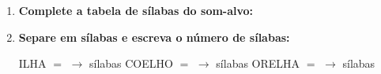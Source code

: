 \begin{exercicio}
\begin{enumerate}[resume]
  \item \textbf{Complete a tabela de sílabas do som-alvo:}

\begin{center}
\end{center}

  \item \textbf{Separe em sílabas e escreva o número de sílabas:}
  \begin{center}
  ILHA $=$ \underline{\hspace{1.2cm}} $\rightarrow$ \underline{\hspace{0.8cm}} sílabas \quad COELHO $=$ \underline{\hspace{1.2cm}} $\rightarrow$ \underline{\hspace{0.8cm}} sílabas \quad ORELHA $=$ \underline{\hspace{1.2cm}} $\rightarrow$ \underline{\hspace{0.8cm}} sílabas
  \end{center}

\end{enumerate}

\end{exercicio}



